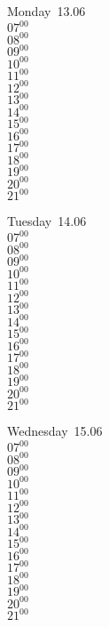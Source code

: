 \documentclass[11pt,a4paper]{book}\usepackage[]{graphicx}\usepackage[]{color}
\begin{document}
\begin{headerbox}
\end{headerbox}
\begin{weekdaybox}
  Monday~13.06\\
  { 
  \vfill
  $07^{00}$\\
$08^{00}$\\
$09^{00}$\\
$10^{00}$\\
$11^{00}$\\
$12^{00}$\\
$13^{00}$\\
$14^{00}$\\
$15^{00}$\\
$16^{00}$\\
$17^{00}$\\
$18^{00}$\\
$19^{00}$\\
$20^{00}$\\
$21^{00}$\\
  }
\end{weekdaybox}
\begin{weekdaybox}
  Tuesday~14.06\\
  { 
  \vfill
  $07^{00}$\\
$08^{00}$\\
$09^{00}$\\
$10^{00}$\\
$11^{00}$\\
$12^{00}$\\
$13^{00}$\\
$14^{00}$\\
$15^{00}$\\
$16^{00}$\\
$17^{00}$\\
$18^{00}$\\
$19^{00}$\\
$20^{00}$\\
$21^{00}$\\
  }
\end{weekdaybox}
\begin{weekdaybox}
  Wednesday~15.06\\
  { 
  \vfill
  $07^{00}$\\
$08^{00}$\\
$09^{00}$\\
$10^{00}$\\
$11^{00}$\\
$12^{00}$\\
$13^{00}$\\
$14^{00}$\\
$15^{00}$\\
$16^{00}$\\
$17^{00}$\\
$18^{00}$\\
$19^{00}$\\
$20^{00}$\\
$21^{00}$\\
  }
\end{weekdaybox}
\end{document}
